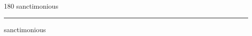
\begin{frame}
\begin{center}
\begin{turn}{180}
{\fontsize{2.5cm}{1em}\selectfont sanctimonious}
\end{turn}
\vspace{1em}\par  
\hrule
\vspace{1em}\par  
{\fontsize{2.5cm}{1em}\selectfont sanctimonious}
\end{center}
\end{frame}
